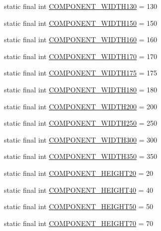 \begin{DoxyCompactItemize}
\item 
static final int \hyperlink{class_display_1_1_display_ad5f14126c874c231b67965c6cdf06178}{C\+O\+M\+P\+O\+N\+E\+N\+T\+\_\+\+W\+I\+D\+T\+H130} = 130
\item 
static final int \hyperlink{class_display_1_1_display_a5684ec094f44cab075327577819190b9}{C\+O\+M\+P\+O\+N\+E\+N\+T\+\_\+\+W\+I\+D\+T\+H150} = 150
\item 
static final int \hyperlink{class_display_1_1_display_a86c529803c94d29b77776f4f56c85f14}{C\+O\+M\+P\+O\+N\+E\+N\+T\+\_\+\+W\+I\+D\+T\+H160} = 160
\item 
static final int \hyperlink{class_display_1_1_display_a8871b58d3f57d5b573779d8af759b7e3}{C\+O\+M\+P\+O\+N\+E\+N\+T\+\_\+\+W\+I\+D\+T\+H170} = 170
\item 
static final int \hyperlink{class_display_1_1_display_a2095098cda35e726fe595b019d78da96}{C\+O\+M\+P\+O\+N\+E\+N\+T\+\_\+\+W\+I\+D\+T\+H175} = 175
\item 
static final int \hyperlink{class_display_1_1_display_a4e3ec7ce466aae4eae284ff350b11253}{C\+O\+M\+P\+O\+N\+E\+N\+T\+\_\+\+W\+I\+D\+T\+H180} = 180
\item 
static final int \hyperlink{class_display_1_1_display_aa5010ddecefd4e39f45361172619b461}{C\+O\+M\+P\+O\+N\+E\+N\+T\+\_\+\+W\+I\+D\+T\+H200} = 200
\item 
static final int \hyperlink{class_display_1_1_display_a4e1ace15de5d4dd0aeb2af46c76742dd}{C\+O\+M\+P\+O\+N\+E\+N\+T\+\_\+\+W\+I\+D\+T\+H250} = 250
\item 
static final int \hyperlink{class_display_1_1_display_a2f111222b6c7d15359547d6f2cbcb01e}{C\+O\+M\+P\+O\+N\+E\+N\+T\+\_\+\+W\+I\+D\+T\+H300} = 300
\item 
static final int \hyperlink{class_display_1_1_display_a63262d6fdb082de5ca713249b0df7703}{C\+O\+M\+P\+O\+N\+E\+N\+T\+\_\+\+W\+I\+D\+T\+H350} = 350
\item 
static final int \hyperlink{class_display_1_1_display_a205927f3e051ee88782c185b37c9e1d5}{C\+O\+M\+P\+O\+N\+E\+N\+T\+\_\+\+H\+E\+I\+G\+H\+T20} = 20
\item 
static final int \hyperlink{class_display_1_1_display_a35a9ab87eca962392fe25c040f594824}{C\+O\+M\+P\+O\+N\+E\+N\+T\+\_\+\+H\+E\+I\+G\+H\+T40} = 40
\item 
static final int \hyperlink{class_display_1_1_display_a3d4ecbb587bdb35ff4e27f0ce4f35e4a}{C\+O\+M\+P\+O\+N\+E\+N\+T\+\_\+\+H\+E\+I\+G\+H\+T50} = 50
\item 
static final int \hyperlink{class_display_1_1_display_afc9a9d568180083ccf2c38b28d908803}{C\+O\+M\+P\+O\+N\+E\+N\+T\+\_\+\+H\+E\+I\+G\+H\+T70} = 70

\end{DoxyCompactItemize}
